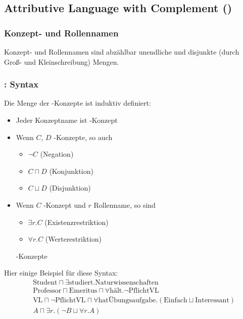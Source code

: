 \subsection{Attributive Language with Complement
(\texorpdfstring{\ALC}{ALC})}\label{attributive-language-with-complement-alc}

\subsubsection{Konzept- und Rollennamen}\label{konzept--und-rollennamen}

Konzept- und Rollennamen sind abzählbar unendliche und disjunkte (durch Groß- und Kleinschreibung) Mengen.

\subsubsection{\texorpdfstring{\ALC}{ALC}: Syntax}\label{alcsyntax}

\begin{definition}
  Die Menge der \ALC-Konzepte ist induktiv definiert:
  \begin{itemize}
    \item Jeder Konzeptname ist \ALC-Konzept
    \item Wenn $C$, $D$ \ALC-Konzepte, so auch
    \begin{itemize}
      \item $\neg C$ \tabto{2cm}(Negation)
      \item $C \sqcap D$ \tabto{2cm}(Konjunktion)
      \item $C \sqcup D$ \tabto{2cm}(Disjunktion)
    \end{itemize}
    \item {Wenn $C$ \ALC-Konzept und $r$ Rollenname, so sind
    \begin{itemize}
      \item $\exists r.C$ \tabto{2cm}(Existenzrestriktion)
      \item $\forall r.C$ \tabto{2cm}(Werterestriktion)
    \end{itemize}
    \ALC-Konzepte}
  \end{itemize}
\end{definition}

\begin{tafel}

Hier einige Beispiel für diese Syntax:
\begin{align*}
    &\text{Student} \sqcap \exists \text{studiert}.\text{Naturwissenschaften}\\
    &\text{Professor} \sqcap \text{Emeritus} \sqcap \forall \text{hält}.\neg \text{PflichtVL}\\
    &\text{VL} \sqcap \neg \text{PflichtVL} \sqcap \forall \text{hatÜbungsaufgabe}.(\text{Einfach} \sqcup \text{Interessant})\\
&A \sqcap \exists r.(\neg B \sqcup \forall r.A)
\end{align*}
\end{tafel}

